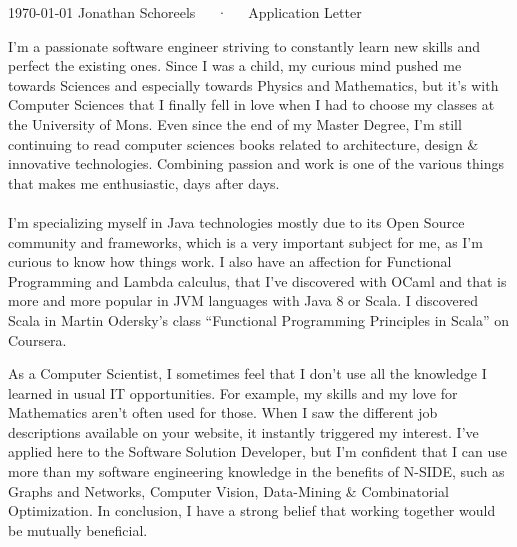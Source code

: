 \documentclass[11pt, a4paper]{awesome-cv}
\begin{document}
\makecvheader[L]

\makecvfooter
  {\today}
  {Jonathan Schoreels~~~·~~~Application Letter}
  {}

\makelettertitle

\begin{cvletter}

I'm a passionate software engineer striving to constantly learn new skills and perfect the existing ones. Since I was a child, my curious mind pushed me towards Sciences and especially towards Physics and Mathematics, but it's with Computer Sciences that I finally fell in love when I had to choose my classes at the University of Mons. Even since the end of my Master Degree, I'm still continuing to read computer sciences books related to architecture, design \& innovative technologies. Combining passion and work is one of the various things that makes me enthusiastic, days after days. 

\paragraph{}
I'm specializing myself in Java technologies mostly due to its Open Source community and frameworks, which is a very important subject for me, as I'm curious to know how things work. I also have an affection for Functional Programming and Lambda calculus, that I've discovered with OCaml and that is more and more popular in JVM languages with Java 8 or Scala. I discovered Scala in Martin Odersky's class ``Functional Programming Principles in Scala'' on Coursera. 

As a Computer Scientist, I sometimes feel that I don't use all the knowledge I learned in usual IT opportunities. For example, my skills and my love for Mathematics aren't often used for those. When I saw the different job descriptions available on your website, it instantly triggered my interest. I've applied here to the Software Solution Developer, but I'm confident that I can use more than my software engineering knowledge in the benefits of N-SIDE, such as Graphs and Networks, Computer Vision, Data-Mining \& Combinatorial Optimization. In conclusion, I have a strong belief that working together would be mutually beneficial.


\end{cvletter}
\end{document}
